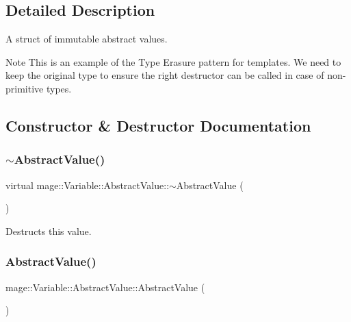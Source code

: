 \subsection{Detailed Description}
A struct of immutable abstract values.

\begin{DoxyNote}{Note}
This is an example of the Type Erasure pattern for templates. We need to keep the original type to ensure the right destructor can be called in case of non-\/primitive types. 
\end{DoxyNote}


\subsection{Constructor \& Destructor Documentation}
\hypertarget{structmage_1_1_variable_1_1_abstract_value_ae3334a01bd2e0a2ea6bd8d3530cf60eb}{}\label{structmage_1_1_variable_1_1_abstract_value_ae3334a01bd2e0a2ea6bd8d3530cf60eb} 
\subsubsection{\texorpdfstring{$\sim$\+Abstract\+Value()}{~AbstractValue()}}
{\footnotesize\ttfamily virtual mage\+::\+Variable\+::\+Abstract\+Value\+::$\sim$\+Abstract\+Value (\begin{DoxyParamCaption}{ }\end{DoxyParamCaption})\hspace{0.3cm}{\ttfamily [virtual]}}

Destructs this value. \hypertarget{structmage_1_1_variable_1_1_abstract_value_a1f7fb1da9789c724e41ce7c7c46889b1}{}\label{structmage_1_1_variable_1_1_abstract_value_a1f7fb1da9789c724e41ce7c7c46889b1} 
\subsubsection{\texorpdfstring{Abstract\+Value()}{AbstractValue()}\hspace{0.1cm}{\footnotesize\ttfamily [1/2]}}
{\footnotesize\ttfamily mage\+::\+Variable\+::\+Abstract\+Value\+::\+Abstract\+Value (\begin{DoxyParamCaption}{ }\end{DoxyParamCaption})\hspace{0.3cm}{\ttfamily [protected]}}

